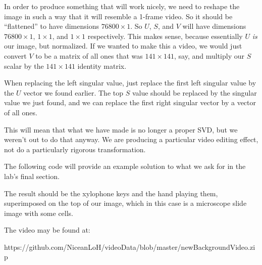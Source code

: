 In order to produce something that will work nicely, we need to reshape the image in such a way that it will resemble a 1-frame video. So it should be ``flattened'' to have dimensions $76800 \times 1$. So $U$, $S$, and $V$ will have dimensions $76800 \times 1$, $1 \times 1$, and $1 \times 1$ respectively. This makes sense, because essentially $U$ \textit{is} our image, but normalized. If we wanted to make this a video, we would just convert $V$ to be a matrix of all ones that was $141 \times 141$, say, and multiply our $S$ scalar by the $141 \times 141$ identity matrix.

When replacing the left singular value, just replace the first left singular value by the $U$ vector we found earlier. The top $S$ value should be replaced by the singular value we just found, and we can replace the first right singular vector by a vector of all ones.

This will mean that what we have made is no longer a proper SVD, but we weren't out to do that anyway. We are producing a particular video editing effect, not do a particularly rigorous transformation.

The following code will provide an example solution to what we ask for in the lab's final section.


The result should be the xylophone keys and the hand playing them, superimposed on the top of our image, which in this case is a microscope slide image with some cells.

The video may be found at:

https://github.com/NiceanLoH/videoData/blob/master/newBackgroundVideo.zip